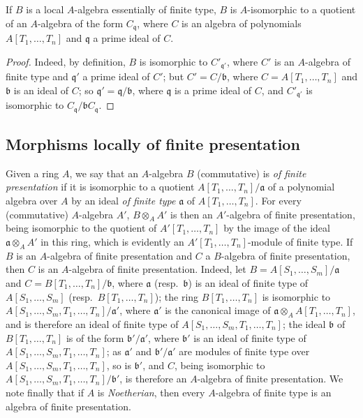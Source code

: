 \begin{proposition}[1.3.11]
\label{IV.1.3.11}
If $B$ is a local $A$-algebra essentially of finite type, $B$ is
$A$-isomorphic to a quotient of an $A$-algebra of the form $C_{\mathfrak{q}}$, where $C$ is an algebra of
polynomials $A[T_1,\ldots,T_n]$ and $\mathfrak{q}$ a prime ideal of $C$.
\end{proposition}

\begin{proof}
Indeed, by definition, $B$ is isomorphic to $C'_{\mathfrak{q}'}$, where $C'$ is an $A$-algebra of finite type
and $\mathfrak{q}'$ a prime ideal of $C'$; but $C'=C/\mathfrak{b}$, where $C=A[T_1,\ldots,T_n]$ and $\mathfrak{b}$ is an
ideal of $C$; so $\mathfrak{q}'=\mathfrak{q}/\mathfrak{b}$, where $\mathfrak{q}$ is a prime ideal of $C$, and $C'_{\mathfrak{q}'}$ is isomorphic to $C_{\mathfrak{q}}/\mathfrak{b} C_{\mathfrak{q}}$.
\end{proof}

\subsection{Morphisms locally of finite presentation}
\label{subsection:IV.1.4}

\begin{env}[1.4.1]
\label{IV.1.4.1}
Given a ring $A$, we say that an $A$-algebra $B$ (commutative) is \emph{of finite presentation} if it is isomorphic to a quotient $A[T_1,\ldots,T_n]/\mathfrak{a}$ of a polynomial algebra over $A$ by an ideal \emph{of finite type} $\mathfrak{a}$ of $A[T_1,\ldots,T_n]$.
For every (commutative) $A$-algebra $A'$, $B\otimes_A A'$ is then an $A'$-algebra of finite presentation, being isomorphic to the quotient of $A'[T_1,\ldots,T_n]$ by the image of the ideal $\mathfrak{a}\otimes_A A'$ in this ring, which is evidently an $A'[T_1,\ldots,T_n]$-module of finite type.
If $B$ is an $A$-algebra of finite presentation and $C$ a $B$-algebra of finite presentation, then $C$ is an $A$-algebra of finite presentation.
Indeed, let $B = A[S_1,\ldots,S_m]/\mathfrak{a}$ and $C = B[T_1,\ldots,T_n]/\mathfrak{b}$, where $\mathfrak{a}$ (resp.~$\mathfrak{b}$) is an ideal of finite type of $A[S_1,\ldots,S_m]$ (resp.~$B[T_1,\ldots,T_n]$); the ring $B[T_1,\ldots,T_n]$ is isomorphic to $A[S_1,\ldots,S_m,T_1,\ldots,T_n]/\mathfrak{a}'$, where $\mathfrak{a}'$ is the canonical image of $\mathfrak{a}\otimes_A A[T_1,\ldots,T_n]$, and is therefore an ideal of finite type of $A[S_1,\ldots,S_m,T_1,\ldots,T_n]$; the ideal $\mathfrak{b}$ of $B[T_1,\ldots,T_n]$ is of the form $\mathfrak{b}'/\mathfrak{a}'$, where $\mathfrak{b}'$ is an ideal of finite type of $A[S_1,\ldots,S_m,T_1,\ldots,T_n]$; as $\mathfrak{a}'$ and $\mathfrak{b}'/\mathfrak{a}'$ are modules of finite type over $A[S_1,\ldots,S_m,T_1,\ldots,T_n]$, so is $\mathfrak{b}'$, and $C$, being isomorphic to $A[S_1,\ldots,S_m,T_1,\ldots,T_n]/\mathfrak{b}'$, is therefore an $A$-algebra of finite presentation.
We note finally that if $A$ is \emph{Noetherian}, then every $A$-algebra of finite type is an algebra of finite presentation.
\end{env}

